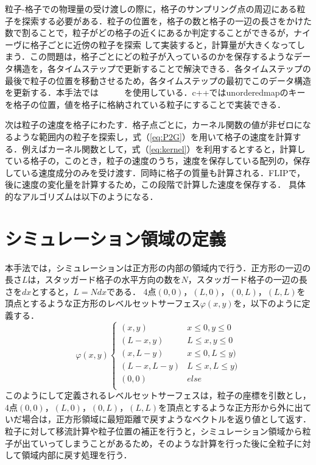 \documentclass[a4j,12pt]{jreport}
\begin{document}
粒子-格子での物理量の受け渡しの際に，格子のサンプリング点の周辺にある粒子を探索する必要がある．粒子の位置を，格子の数と格子の一辺の長さをかけた数で割ることで，粒子がどの格子の近くにあるか判定することができるが，ナイーヴに格子ごとに近傍の粒子を探索
して実装すると，計算量が大きくなってしまう．この問題は，格子ごとにどの粒子が入っているのかを保存するようなデータ構造を，各タイムステップで更新することで解決できる．各タイムステップの最後で粒子の位置を移動させるため，各タイムステップの最初でこのデータ構造を更新する．本手法では　　　を使用している．c++ではunorderedmapのキーを格子の位置，値を格子に格納されている粒子にすることで実装できる．

次は粒子の速度を格子にわたす．格子点ごとに，カーネル関数の値が非ゼロになるような範囲内の粒子を探索し，式（\ref{eq:P2G}）を用いて格子の速度を計算する．例えばカーネル関数として，式（\ref{eq:kernel}）を利用するとすると，計算している格子の，このとき，粒子の速度のうち，速度を保存している配列の，保存している速度成分のみを受け渡す．同時に格子の質量も計算される．FLIPで，後に速度の変化量を計算するため，この段階で計算した速度を保存する．
具体的なアルゴリズムは以下のようになる．

\section{シミュレーション領域の定義} \label{sec:levelsetserface}
本手法では，シミュレーションは正方形の内部の領域内で行う．正方形の一辺の長さ$L$は，スタッガード格子の水平方向の数を$N$，スタッガード格子の一辺の長さを$dx$とすると，$L = Ndx$である．
4点$(0,0)，(L,0)，(0,L)，(L,L)$を頂点とするような正方形のレベルセットサーフェス$\varphi(x,y)$を，以下のように定義する．
\begin{equation}\label{eq:levelsetserface}
\varphi(x,y)
\begin{cases}
(x,y) & x \le0 , y \le 0\\
(L - x,y) & L \le x , y \le 0\\
(x,L-y) & x \le0 , L \le y)\\
(L-x,L-y) & L \le x , L \le y)\\
(0,0) & else\\
\end{cases}
\end{equation} 
このようにして定義されるレベルセットサーフェスは，粒子の座標を引数とし，4点$(0,0)，(L,0)，(0,L)，(L,L)$を頂点とするような正方形から外に出ていだ場合は，正方形領域に最短距離で戻すようなベクトルを返り値として返す．粒子に対して移流計算や粒子位置の補正を行うと，シミュレーション領域から粒子が出ていってしまうことがあるため，そのような計算を行った後に全粒子に対して領域内部に戻す処理を行う．
\end{document}
